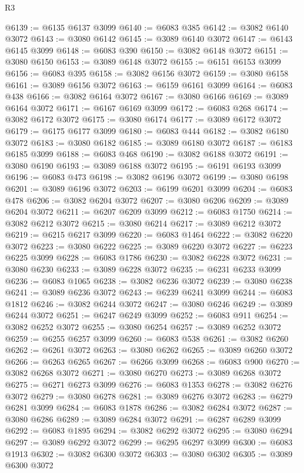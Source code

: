 \begin{lexlean}{R3}
\begin{coremodule}
@6139 := @6135 @6137 @3099
@6140 := @6083 @385
@6142 := @3082 @6140 @3072
@6143 := @3080 @6142
@6145 := @3089 @6140 @3072
@6147 := @6143 @6145 @3099
@6148 := @6083 @390
@6150 := @3082 @6148 @3072
@6151 := @3080 @6150
@6153 := @3089 @6148 @3072
@6155 := @6151 @6153 @3099
@6156 := @6083 @395
@6158 := @3082 @6156 @3072
@6159 := @3080 @6158
@6161 := @3089 @6156 @3072
@6163 := @6159 @6161 @3099
@6164 := @6083 @438
@6166 := @3082 @6164 @3072
@6167 := @3080 @6166
@6169 := @3089 @6164 @3072
@6171 := @6167 @6169 @3099
@6172 := @6083 @268
@6174 := @3082 @6172 @3072
@6175 := @3080 @6174
@6177 := @3089 @6172 @3072
@6179 := @6175 @6177 @3099
@6180 := @6083 @444
@6182 := @3082 @6180 @3072
@6183 := @3080 @6182
@6185 := @3089 @6180 @3072
@6187 := @6183 @6185 @3099
@6188 := @6083 @468
@6190 := @3082 @6188 @3072
@6191 := @3080 @6190
@6193 := @3089 @6188 @3072
@6195 := @6191 @6193 @3099
@6196 := @6083 @473
@6198 := @3082 @6196 @3072
@6199 := @3080 @6198
@6201 := @3089 @6196 @3072
@6203 := @6199 @6201 @3099
@6204 := @6083 @478
@6206 := @3082 @6204 @3072
@6207 := @3080 @6206
@6209 := @3089 @6204 @3072
@6211 := @6207 @6209 @3099
@6212 := @6083 @1750
@6214 := @3082 @6212 @3072
@6215 := @3080 @6214
@6217 := @3089 @6212 @3072
@6219 := @6215 @6217 @3099
@6220 := @6083 @1464
@6222 := @3082 @6220 @3072
@6223 := @3080 @6222
@6225 := @3089 @6220 @3072
@6227 := @6223 @6225 @3099
@6228 := @6083 @1786
@6230 := @3082 @6228 @3072
@6231 := @3080 @6230
@6233 := @3089 @6228 @3072
@6235 := @6231 @6233 @3099
@6236 := @6083 @1065
@6238 := @3082 @6236 @3072
@6239 := @3080 @6238
@6241 := @3089 @6236 @3072
@6243 := @6239 @6241 @3099
@6244 := @6083 @1812
@6246 := @3082 @6244 @3072
@6247 := @3080 @6246
@6249 := @3089 @6244 @3072
@6251 := @6247 @6249 @3099
@6252 := @6083 @911
@6254 := @3082 @6252 @3072
@6255 := @3080 @6254
@6257 := @3089 @6252 @3072
@6259 := @6255 @6257 @3099
@6260 := @6083 @538
@6261 := @3082 @6260
@6262 := @6261 @3072
@6263 := @3080 @6262
@6265 := @3089 @6260 @3072
@6266 := @6263 @6265
@6267 := @6266 @3099
@6268 := @6083 @900
@6270 := @3082 @6268 @3072
@6271 := @3080 @6270
@6273 := @3089 @6268 @3072
@6275 := @6271 @6273 @3099
@6276 := @6083 @1353
@6278 := @3082 @6276 @3072
@6279 := @3080 @6278
@6281 := @3089 @6276 @3072
@6283 := @6279 @6281 @3099
@6284 := @6083 @1878
@6286 := @3082 @6284 @3072
@6287 := @3080 @6286
@6289 := @3089 @6284 @3072
@6291 := @6287 @6289 @3099
@6292 := @6083 @1895
@6294 := @3082 @6292 @3072
@6295 := @3080 @6294
@6297 := @3089 @6292 @3072
@6299 := @6295 @6297 @3099
@6300 := @6083 @1913
@6302 := @3082 @6300 @3072
@6303 := @3080 @6302
@6305 := @3089 @6300 @3072

\end{coremodule}
\end{lexlean}
